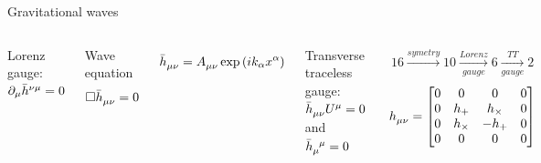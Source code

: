 \documentclass[pdf]{beamer}
\begin{document}
\begin{frame}{Gravitational waves}

	\begin{columns}
	\hspace{.5cm}
	Lorenz gauge: $\partial_\mu \tensor{\bar{h}}{^\nu^\mu} = 0$
	\begin{block}{Wave equation}
	\begin{equation*}
	\Box \tensor{\bar{h}}{_\mu_\nu} = 0
	\end{equation*}		
	\end{block}
	
	\begin{equation*}
	\tensor{\bar{h}}{_\mu_\nu} = \tensor{A}{_\mu_\nu} \exp{(ik_\alpha x^\alpha)}
	\end{equation*}
	
	Transverse traceless gauge: $\tensor{\bar{h}}{_\mu_\nu} U^\mu = 0$ and $\tensor{\bar{h}}{_\mu^\mu} = 0$
	
	
	\pause
	
	\begin{align*}
	16 \xrightarrow{symetry} 10 \xrightarrow[gauge]{Lorenz} 6 \xrightarrow[gauge]{TT} 2
	\end{align*}		
	\begin{equation*}
	\tensor{h}{_\mu_\nu} = \begin{bmatrix}
	0&0&0&0\\
	0&h_+&h_\times&0\\
	0&h_\times&-h_+&0\\
	0&0&0&0
	\end{bmatrix}
	\end{equation*}		
	
\begin{figure}
\end{figure}		
	
	\end{columns}

\end{frame}
\end{document}
